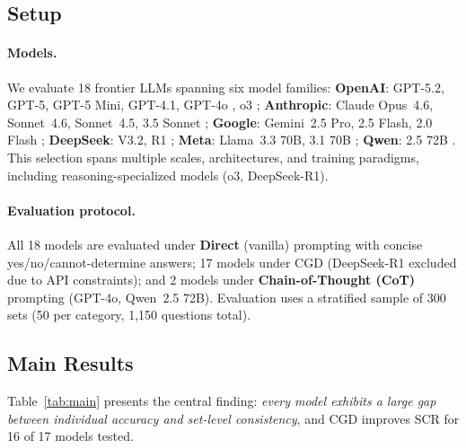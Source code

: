 \documentclass{article}
\newcommand{\method}{\textsc{CGD}}
\begin{document}
\subsection{Setup}

\paragraph{Models.} We evaluate 18 frontier LLMs spanning six model families: \textbf{OpenAI}: GPT-5.2, GPT-5, GPT-5 Mini, GPT-4.1, GPT-4o \citep{openai2024gpt4o}, o3 \citep{openai2025o3, openai2025gpt5}; \textbf{Anthropic}: Claude Opus~4.6, Sonnet~4.6, Sonnet~4.5, 3.5 Sonnet \citep{anthropic2025claude4, anthropic2024claude}; \textbf{Google}: Gemini~2.5 Pro, 2.5 Flash, 2.0 Flash \citep{google2025gemini25, google2024gemini}; \textbf{DeepSeek}: V3.2, R1 \citep{deepseekai2025deepseekv3, deepseekai2025deepseekr1}; \textbf{Meta}: Llama~3.3 70B, 3.1 70B \citep{meta2024llama33, dubey2024llama}; \textbf{Qwen}: 2.5 72B \citep{qwen2024qwen25}. This selection spans multiple scales, architectures, and training paradigms, including reasoning-specialized models (o3, DeepSeek-R1).

\paragraph{Evaluation protocol.} All 18 models are evaluated under \textbf{Direct} (vanilla) prompting with concise yes/no/cannot-determine answers; 17 models under \method{} (DeepSeek-R1 excluded due to API constraints); and 2 models under \textbf{Chain-of-Thought (CoT)} prompting (GPT-4o, Qwen~2.5 72B). Evaluation uses a stratified sample of 300 sets (50 per category, 1,150 questions total).

\subsection{Main Results}

Table~\ref{tab:main} presents the central finding: \emph{every model exhibits a large gap between individual accuracy and set-level consistency}, and \method{} improves SCR for 16 of 17 models tested.
\end{document}
